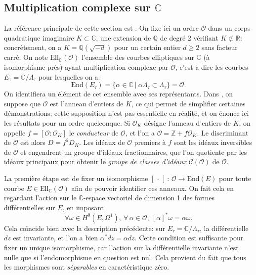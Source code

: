 \documentclass[11pt,a4paper]{article}
\newcommand{\Z}{\mathbb{Z}}
\newcommand{\C}{\mathbb{C}}
\newcommand{\Q}{\mathbb{Q}}
\newcommand{\R}{\mathbb{R}}
\renewcommand{\O}{\mathcal{O}}
\newcommand{\Cl}{\mathcal{C}}
\newcommand{\vers}{\longrightarrow}
\newcommand{\End}{\mathrm{End}}
\newcommand{\Ell}{\mathrm{Ell}}
\newcommand{\de}{\,:\,}
\renewcommand{\v}{\vspace{5mm}}
\theoremstyle{definition}
\begin{document}
\subsection{Multiplication complexe sur $\C$}


La référence principale de cette section est \cite{Sil2}. On fixe ici un ordre $\O$ dans un corps quadratique imaginaire $K\subset \C$, une extension de $\Q$ de degré 2 vérifiant $K \not\subset\R$: concrètement, on a $K=\Q(\sqrt{-d})$ pour un certain entier $d\geq 2$ sans facteur carré. On note $\Ell_\C(\O)$ l'ensemble des courbes elliptiques sur $\C$ (à isomorphisme près) ayant multiplication complexe par $\O$, c'est à dire les courbes $E_\tau = \C/\Lambda_\tau$ pour lesquelles on a:
$$\End(E_\tau) = \{\alpha\in \C\ |\ \alpha\Lambda_\tau \subset \Lambda_\tau\} = \O.$$
On identifiera un élément de cet ensemble avec ses représentants. Dans \cite{Sil2}, on suppose que $\O$ est l'anneau d'entiers de $K$, ce qui permet de simplifier certaines démonstrations; cette supposition n'est pas essentielle en réalité, et on énonce ici les résultats pour un ordre quelconque. %
Si $\O_K$ désigne l'anneau d'entiers de $K$, on appelle $f=[\O:\O_K]$ le \emph{conducteur} de $\O$, et l'on a $\O = \Z  + f \O_K$. Le discriminant de $\O$ est alors $D = f^2 D_K$. Les idéaux de $\O$ premiers à $f$ sont les idéaux inversibles de $\O$ et engendrent un groupe d'idéaux fractionnaires, que l'on quotiente par les idéaux principaux pour obtenir le \emph{groupe de classes d'idéaux} $\Cl(\O)$ de $\O$.
\v

La première étape est de fixer un isomorphisme $[\,\cdot\,]\de \O\vers \End(E)$ pour toute courbe $E\in \Ell_\C(\O)$ afin de pouvoir identifier ces anneaux. On fait cela en regardant l'action sur le $\C$-espace vectoriel de dimension 1 des formes différentielles sur $E$, en imposant
$$\forall \omega\in H^0(E,\Omega^1),\ \forall\,\alpha\in\O,\ [\alpha]^*\omega = \alpha \omega.$$
Cela coïncide bien avec la description précédente: sur $E_\tau = \C/\Lambda_\tau$, la différentielle $dz$ est invariante, et l'on a bien $\alpha^* dz = \alpha dz$. Cette condition est suffisante pour fixer un unique isomorphisme, car l'action sur la différentielle invariante n'est nulle que si l'endomorphisme en question est nul. Cela provient du fait que tous les morphismes sont \emph{séparables} en caractéristique zéro.
\end{document}
